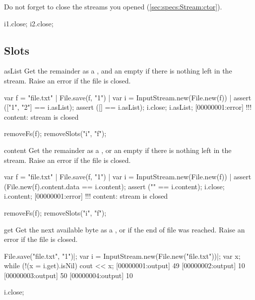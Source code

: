 Do not forget to close the streams you opened
(\autoref{sec:specs:Stream:ctor}).

\begin{urbiscript}
i1.close;
i2.close;
\end{urbiscript}

\subsection{Slots}

\begin{urbiscriptapi}
\item[asList]%
  Get the remainder as a , and an empty 
  if there is nothing left in the stream. Raise an error if the file is closed.
\begin{urbiscript}
var f = "file.txt" |
File.save(f, "1\n") |
var i = InputStream.new(File.new(f)) |
assert (["1", "2"] == i.asList);
assert ([] == i.asList);
i.close;
i.asList;
[00000001:error] !!! content: stream is closed
\end{urbiscript}
\begin{urbicomment}
removeFs(f);
removeSlots("i", "f");
\end{urbicomment}

\item[content]%
  Get the remainder as a , or an empty  if
  there is nothing left in the stream. Raise an error if the file is closed.
\begin{urbiscript}
var f = "file.txt" |
File.save(f, "1\n") |
var i = InputStream.new(File.new(f)) |
assert (File.new(f).content.data == i.content);
assert ("" == i.content);
i.close;
i.content;
[00000001:error] !!! content: stream is closed
\end{urbiscript}
\begin{urbicomment}
removeFs(f);
removeSlots("i", "f");
\end{urbicomment}

\item[get]%
  Get the next available byte as a , or  if
  the end of file was reached.  Raise an error if the file is closed.
\begin{urbiscript}
File.save("file.txt", "1\n")|;
var i = InputStream.new(File.new("file.txt"))|;
var x;
while (!(x = i.get).isNil)
  cout << x;
[00000001:output] 49
[00000002:output] 10
[00000003:output] 50
[00000004:output] 10

i.close;


\end{urbiscript}
\end{urbiscriptapi}
